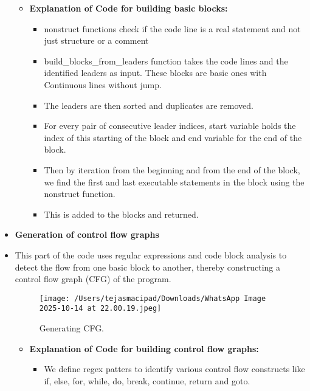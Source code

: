 \documentclass[12pt, a4paper]{report}
\begin{document}
\begin{itemize}
        \begin{itemize}
            \item \textbf{Explanation of Code for building basic blocks:}
            \begin{itemize}
                \item nonstruct functions check if the code line is a real statement and not just structure or a comment
                \item build\_blocks\_from\_leaders function takes the code lines and the identified leaders as input. These blocks are basic ones with Continuous lines without jump.
                \item The leaders are then sorted and duplicates are removed. 
                \item For every pair of consecutive leader indices, start variable holds the index of this starting of the block and end variable for the end of the block.
                \item Then by iteration from the beginning and from the end of the block, we find the first and last executable statements in the block using the nonstruct function.
                \item This is added to the blocks and returned.
            \end{itemize}
        \end{itemize}

    \item \textbf{Generation of control flow graphs}
    \item This part of the code uses regular expressions and code block analysis to detect the flow from one basic block to another, thereby constructing a control flow graph (CFG) of the program.
        \begin{figure}[h!]
            \centering
            \texttt{[image: /Users/tejasmacipad/Downloads/WhatsApp Image 2025-10-14 at 22.00.19.jpeg]}
            \caption{Generating CFG.}
            \label{fig:diff-example-55}
        \end{figure}

        \begin{itemize}
            \item \textbf{Explanation of Code for building control flow graphs:}
            \begin{itemize}
                \item We define regex patters to identify various control flow constructs like if, else, for, while, do, break, continue, return and goto.

\end{itemize}
\end{itemize}
\end{itemize}
\end{document}
